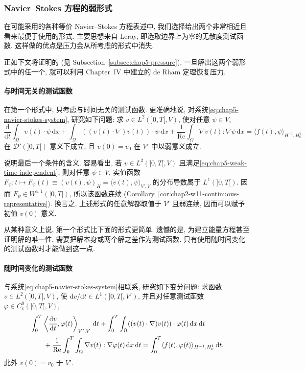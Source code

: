 \subsubsection{Navier--Stokes 方程的弱形式}
\label{subsec:chap5-weak-formulations}

在可能采用的各种等价 Navier--Stokes 方程表述中, 我们选择给出两个非常相近且看来最便于使用的形式. 主要思想来自 Leray, 即选取边界上为零的无散度测试函数. 这样做的优点是压力会从所考虑的形式中消失.

正如下文将证明的 (见 Subsection~\ref{subsec:chap5-pressure}), 一旦解出这两个弱形式中的任一个, 就可以利用 Chapter~IV 中建立的 de Rham 定理恢复压力.

\paragraph{与时间无关的测试函数}

在第一个形式中, 只考虑与时间无关的测试函数. 更准确地说, 对系统\eqref{eq:chap5-navier-stokes-system}, 研究如下问题: 求 $v\in L^2(]0,T[,V)$, 使对任意 $\psi\in V$,
\begin{equation}
 \frac{\mathrm d}{\mathrm dt}\int_\Omega v(t)\cdot\psi\,\mathrm dx
 +\int_\Omega((v(t)\cdot\nabla)v(t))\cdot\psi\,\mathrm dx
 +\frac1{\operatorname{Re}}\int_\Omega\nabla v(t):\nabla\psi\,\mathrm dx
 =\langle f(t),\psi\rangle_{H^{-1},H_0^1}
\label{eq:chap5-weak-time-independent}
\end{equation}
在 $\mathcal D'(]0,T[)$ 意义下成立, 且 $v(0)=v_0$ 在 $V'$ 中以弱意义成立.

说明最后一个条件的含义. 容易看出, 若 $v\in L^2(]0,T[,V)$ 且满足\eqref{eq:chap5-weak-time-independent}, 则对任意 $\psi\in V$, 实值函数
$F_\psi:t\mapsto F_\psi(t)\equiv(v(t),\psi)_H=\langle v(t),\psi\rangle_{V',V}$ 的分布导数属于 $L^1(]0,T[)$. 因而 $F_\psi\in W^{1,1}(]0,T[)$, 所以该函数连续 (Corollary~\ref{cor:chap2-w11-continuous-representative}). 换言之, 上述形式的任意解都取值于 $V'$ 且弱连续, 因而可以赋予初值 $v(0)$ 意义.

从某种意义上说, 第一个形式比下面的形式更简单. 遗憾的是, 为建立能量方程甚至证明解的唯一性, 需要把解本身或两个解之差作为测试函数. 只有使用随时间变化的测试函数时才能做到这一点.

\paragraph{随时间变化的测试函数}

与系统\eqref{eq:chap5-navier-stokes-system}相联系, 研究如下变分问题: 求函数 $v\in L^2(]0,T[,V)$, 使 $\mathrm dv/\mathrm dt\in L^1(]0,T[,V')$, 并且对任意测试函数 $\varphi\in C_c^0(]0,T[,V)$,
\begin{align}
 &\int_0^T\left\langle\frac{\mathrm dv}{\mathrm dt},\varphi(t)\right\rangle_{V',V}\,\mathrm dt
 +\int_0^T\int_\Omega((v(t)\cdot\nabla)v(t))\cdot\varphi(t)\,\mathrm dx\,\mathrm dt\notag\\
 &\qquad+\frac1{\operatorname{Re}}\int_0^T\int_\Omega\nabla v(t):\nabla\varphi(t)\,\mathrm dx\,\mathrm dt
 =\int_0^T\langle f(t),\varphi(t)\rangle_{H^{-1},H_0^1}\,\mathrm dt,
\label{eq:chap5-weak-time-dependent}
\end{align}
此外 $v(0)=v_0$ 于 $V'$.

